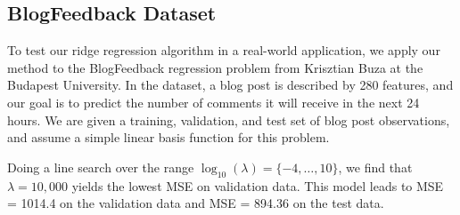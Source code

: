 \subsection{BlogFeedback Dataset}
To test our ridge regression algorithm in a real-world application, we apply our method to the BlogFeedback regression problem from Krisztian Buza at the Budapest University.  In the dataset, a blog post is described by 280 features, and our goal is to predict the number of comments it will receive in the next 24 hours.  We are given a training, validation, and test set of blog post observations, and assume a simple linear basis function for this problem.  

Doing a line search over the range $\log_{10}(\lambda) = \{-4,\ldots,10\}$, we find that $\lambda = 10,000$ yields the lowest MSE on validation data.  This model leads to MSE = 1014.4 on the validation data and MSE = 894.36 on the test data.  